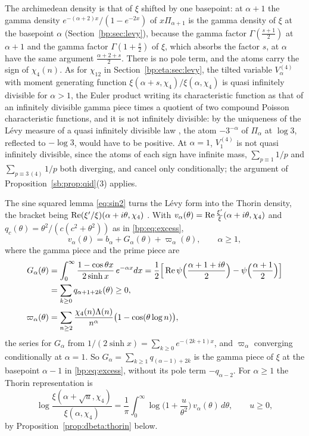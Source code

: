 The archimedean density is that of $\xi$ shifted by one basepoint: at $\alpha+1$ the gamma density $e^{-(\alpha+2)x}/(1-e^{-2x})$ of $x\Pi_{\alpha+1}$ is the gamma density of $\xi$ at the basepoint $\alpha$ (Section~\ref{bp:sec:levy}), because the gamma factor $\Gamma(\frac{s+1}2)$ at $\alpha+1$ and the gamma factor $\Gamma(1+\frac s2)$ of $\xi$, which absorbs the factor $s$, at $\alpha$ have the same argument $\frac{\alpha+2+s}2$. There is no pole term, and the atoms carry the sign of $\chi_4(n)$. As for $\chi_{12}$ in Section~\ref{bp:eta:sec:levy}, the tilted variable $V^{(4)}_\alpha$ with moment generating function $\xi(\alpha+s,\chi_4)/\xi(\alpha,\chi_4)$ is quasi infinitely divisible for $\alpha>1$, the Euler product writing its characteristic function as that of an infinitely divisible gamma piece times a quotient of two compound Poisson characteristic functions, and it is not infinitely divisible: by the uniqueness of the L\'evy measure of a quasi infinitely divisible law \cite{LPS18}, the atom $-3^{-\alpha}$ of $\Pi_\alpha$ at $\log3$, reflected to $-\log3$, would have to be positive. At $\alpha=1$, $V^{(4)}_1$ is not quasi infinitely divisible, since the atoms of each sign have infinite mass, $\sum_{p\equiv1}1/p$ and $\sum_{p\equiv3\,(4)}1/p$ both diverging, and cancel only conditionally; the argument of Proposition~\ref{sb:prop:qid}(3) applies.

The sine squared lemma \eqref{eq:sin2} turns the L\'evy form into the Thorin density, the bracket being $\operatorname{Re}(\xi'/\xi)(\alpha+i\theta,\chi_4)$ \cite[Theorem 8.2]{P17}. With $v_\alpha(\theta)=\operatorname{Re}\frac{\xi'}\xi(\alpha+i\theta,\chi_4)$ and $q_c(\theta)=\theta^2/(c(c^2+\theta^2))$ as in \eqref{bp:eq:excess},
\begin{equation}\label{eq:dbeta:sin2}
v_\alpha(\theta)=b_\alpha+G_\alpha(\theta)+\varpi_\alpha(\theta),\qquad\alpha\ge1,
\end{equation}
where the gamma piece and the prime piece are
\begin{align*}
G_\alpha(\theta)&=\int_0^\infty\frac{1-\cos\theta x}{2\sinh x}\,e^{-\alpha x}dx=\frac12\Big[\operatorname{Re}\psi\Big(\frac{\alpha+1+i\theta}2\Big)-\psi\Big(\frac{\alpha+1}2\Big)\Big]\\
&=\sum_{k\ge0}q_{\alpha+1+2k}(\theta)\ge0,\\
\varpi_\alpha(\theta)&=\sum_{n\ge2}\frac{\chi_4(n)\Lambda(n)}{n^\alpha}\big(1-\cos(\theta\log n)\big),
\end{align*}
the series for $G_\alpha$ from $1/(2\sinh x)=\sum_{k\ge0}e^{-(2k+1)x}$, and $\varpi_\alpha$ converging conditionally at $\alpha=1$. So $G_\alpha=\sum_{k\ge1}q_{(\alpha-1)+2k}$ is the gamma piece of $\xi$ at the basepoint $\alpha-1$ in \eqref{bp:eq:excess}, without its pole term $-q_{\alpha-2}$. For $\alpha\ge1$ the Thorin representation is
\begin{equation}\label{eq:dbeta:thorinrep}
\log\frac{\xi(\alpha+\sqrt u,\chi_4)}{\xi(\alpha,\chi_4)}=\frac1\pi\int_0^\infty\log\Big(1+\frac u{\theta^2}\Big)\,v_\alpha(\theta)\,d\theta,\qquad u\ge0,
\end{equation}
by Proposition~\ref{prop:dbeta:thorin} below.

